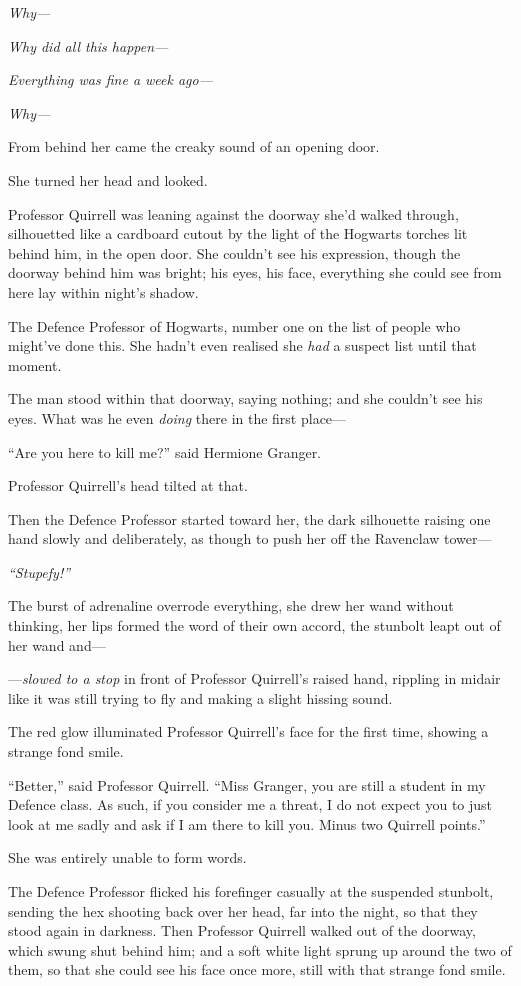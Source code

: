 \emph{Why---}

\emph{Why did all this happen---}

\emph{Everything was fine a week ago---}

\emph{Why---}

From behind her came the creaky sound of an opening door.

She turned her head and looked.

Professor Quirrell was leaning against the doorway she'd walked through,
silhouetted like a cardboard cutout by the light of the Hogwarts torches
lit behind him, in the open door. She couldn't see his expression,
though the doorway behind him was bright; his eyes, his face, everything
she could see from here lay within night's shadow.

The Defence Professor of Hogwarts, number one on the list of people who
might've done this. She hadn't even realised she \emph{had} a suspect
list until that moment.

The man stood within that doorway, saying nothing; and she couldn't see
his eyes. What was he even \emph{doing} there in the first place---

``Are you here to kill me?'' said Hermione Granger.

Professor Quirrell's head tilted at that.

Then the Defence Professor started toward her, the dark silhouette
raising one hand slowly and deliberately, as though to push her off the
Ravenclaw tower---

\emph{``Stupefy!''}

The burst of adrenaline overrode everything, she drew her wand without
thinking, her lips formed the word of their own accord, the stunbolt
leapt out of her wand and---

---\emph{slowed to a stop} in front of Professor Quirrell's raised hand,
rippling in midair like it was still trying to fly and making a slight
hissing sound.

The red glow illuminated Professor Quirrell's face for the first time,
showing a strange fond smile.

``Better,'' said Professor Quirrell. ``Miss Granger, you are still a
student in my Defence class. As such, if you consider me a threat, I do
not expect you to just look at me sadly and ask if I am there to kill
you. Minus two Quirrell points.''

She was entirely unable to form words.

The Defence Professor flicked his forefinger casually at the suspended
stunbolt, sending the hex shooting back over her head, far into the
night, so that they stood again in darkness. Then Professor Quirrell
walked out of the doorway, which swung shut behind him; and a soft white
light sprung up around the two of them, so that she could see his face
once more, still with that strange fond smile.

